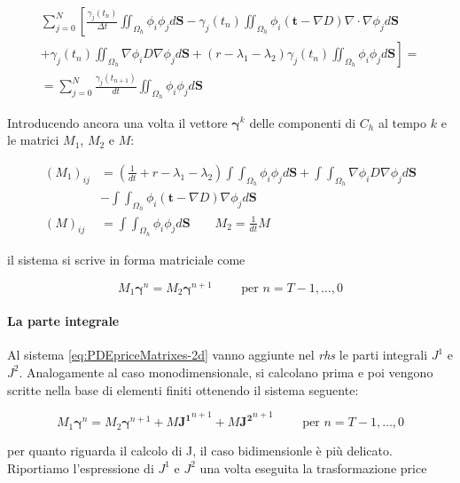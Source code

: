 \documentclass[a4paper,10pt]{report}
\theoremstyle{plain}
\theoremstyle{definition}
\theoremstyle{remark}
\begin{document}
\begin{multline*}
 \sum_{j=0}^N\left[\frac{\gamma_j(t_n)}{\Delta t}\iint_{\Omega_h}\phi_i\phi_j d\mathbf{S} -\gamma_j(t_n)\iint_{\Omega_h}\phi_i(\mathbf{t}-\nabla D)\nabla \cdot \nabla\phi_j d\mathbf{S}\right.\\
 \left.+\gamma_j(t_n)\iint_{\Omega_h}\nabla\phi_i D \nabla\phi_j d\mathbf{S}+(r-\lambda_1-\lambda_2)\gamma_j(t_n)\iint_{\Omega_h}\phi_i\phi_j d\mathbf{S} \right]=\\
 =\sum_{j=0}^N\frac{\gamma_j(t_{n+1})}{dt}\iint_{\Omega_h}\phi_i\phi_j d\mathbf{S}
\end{multline*}


Introducendo ancora una volta il vettore $\bm{\gamma}^k$ delle componenti di $C_h$ al tempo $k$ e le matrici $M_1$, $M_2$ e $M$:

\begin{align*}
 (M_1)_{ij}&=\left(\frac{1}{dt}+r-\lambda_1-\lambda_2\right)\int\int_{\Omega_h}\phi_i\phi_jd\mathbf{S}+\int\int_{\Omega_h}\nabla\phi_i D \nabla\phi_j d\mathbf{S}\\&
 -\int\int_{\Omega_h}\phi_i(\mathbf{t}-\nabla D)\nabla\phi_j d\mathbf{S}\\
 (M)_{ij}&=\int\int_{\Omega_h}\phi_i\phi_j d\mathbf{S} \qquad M_2=\frac{1}{dt}M
\end{align*}

il sistema si scrive in forma matriciale come

\begin{equation}
 \label{eq:PDEpriceMatrixes-2d}
 M_1 \bm{\gamma}^n=M_2\bm{\gamma}^{n+1} \qquad \text{ per } n=T-1,\dots,0
\end{equation}

\paragraph{La parte integrale}
Al sistema \eqref{eq:PDEpriceMatrixes-2d} vanno aggiunte nel \emph{rhs} le parti integrali $J^1$ e $J^2$. Analogamente al caso monodimensionale, si calcolano prima e poi vengono scritte nella base di elementi finiti ottenendo il sistema seguente:

\begin{equation}
 \label{eq:PDEpriceMatrixeswithJ-2d}
 M_1 \bm{\gamma}^n=M_2\bm{\gamma}^{n+1}+M\mathbf{J^1}^{n+1}+M\mathbf{J^2}^{n+1}\qquad \text{ per } n=T-1,\dots,0
\end{equation}

per quanto riguarda il calcolo di J, il caso bidimensionle è più delicato. Riportiamo l'espressione di $J^1$ e $J^2$ una volta eseguita la trasformazione price
\end{document}
